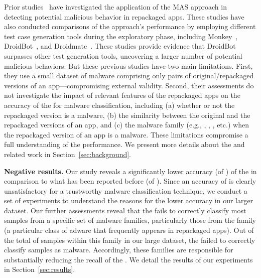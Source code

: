 Prior studies~\cite{DBLP:conf/wcre/BaoLL18,DBLP:journals/jss/CostaMMSSBNR22} have investigated the application of the MAS approach in detecting potential malicious behavior in repackaged apps. These studies have also conducted comparisons of the approach's performance by employing different test case generation tools during the exploratory phase, including Monkey~\cite{Monkey}, DroidBot~\cite{DBLP:conf/icse/LiYGC17}, and Droidmate~\cite{DBLP:conf/kbse/BorgesHZ18}.
These studies provide evidence that DroidBot surpasses other test generation tools, uncovering a larger number of potential malicious behaviors.
But these previous studies have two main limitations.
First, they use a small dataset of malware comprising only \appsSmall pairs of original/repackaged versions of an app---compromising external validity. Second, their assessments do not investigate
the impact of relevant features of the repackaged apps on the accuracy of the \mas for malware classification, including
(a) whether or not the repackaged version is a malware, (b) the similarity between the original and the repackaged versions of an app,
and (c) the malware family (e.g., , , , etc.) when the repackaged
version of an app is a malware. These limitations compromise a full understanding of the \mas performance. We present more details about the \mas and related work in Section~\ref{sec:background}.


{\bf Negative results.} Our study reveals a significantly lower
accuracy (\fone of \fscore) of the \mas in comparison to what has been reported before (\fone of \fscoreSmall). 
Since an accuracy of \fscore is clearly unsatisfactory for a trustworthy malware classification technique, we conduct a set of experiments 
to understand the reasons for the lower accuracy in our larger dataset.
Our further assessments reveal that the \mas fails to correctly classify most samples from a specific set of malware families, particularly those from the \gps family (a particular class of adware that frequently appears in repackaged apps). Out of the total of \appsGps samples within this family in our large dataset, the \mas failed to correctly classify \appsGpsFN samples as malware. Accordingly, these families are responsible for substantially reducing the recall of the \mas. We detail the results of our experiments in Section~\ref{sec:results}. 

